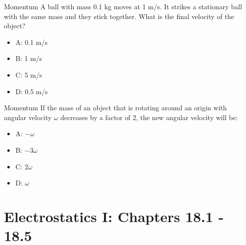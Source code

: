 \documentclass{beamer}
\begin{document}
\begin{frame}{Momentum}
A ball with mass 0.1 kg moves at 1 m/s.  It strikes a stationary ball with the same mass and they stick together.  What is the final velocity of the object?
\begin{itemize}
\item A: 0.1 m/s
\item B: 1 m/s
\item C: 5 m/s
\item D: 0.5 m/s
\end{itemize}
\end{frame}

\begin{frame}{Momentum}
If the mass of an object that is rotating around an origin with angular velocity $\omega$ decreases by a factor of 2, the new angular velocity will be:
\begin{itemize}
\item A: $-\omega$
\item B: $-3\omega$
\item C: $2\omega$
\item D: $\omega$
\end{itemize}
\end{frame}

\section{Electrostatics I: Chapters 18.1 - 18.5}
\end{document}
